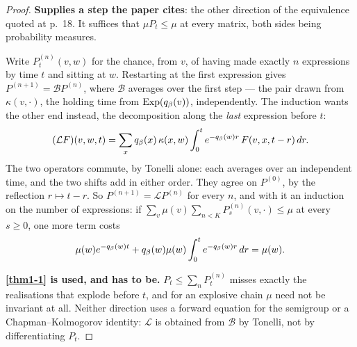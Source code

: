 \begin{proof}
  \leanok
  \textbf{Supplies a step the paper cites}: the other direction of the
  equivalence quoted at p.~18.  It suffices that $\mu P_t \le \mu$ at every
  matrix, both sides being probability measures.

  Write $P^{(n)}_t(v,w)$ for the chance, from $v$, of having made exactly $n$
  expressions by time $t$ and sitting at $w$.  Restarting at the first
  expression gives $P^{(n+1)} = \mathcal{B} P^{(n)}$, where $\mathcal{B}$
  averages over the first step --- the pair drawn from $\kappa(v,\cdot)$, the
  holding time from $\mathrm{Exp}(q_\beta(v))$, independently.  The induction
  wants the other end instead, the decomposition along the \emph{last}
  expression before $t$:
  \[
    (\mathcal{L}F)(v,w,t) = \sum_x q_\beta(x)\,\kappa(x,w)
      \int_0^t e^{-q_\beta(w)r}\,F(v,x,t-r)\,dr .
  \]
  The two operators commute, by Tonelli alone: each averages over an
  independent time, and the two shifts add in either order.  They agree on
  $P^{(0)}$, by the reflection $r \mapsto t - r$.  So $P^{(n+1)} =
  \mathcal{L}P^{(n)}$ for every $n$, and with it an induction on the number of
  expressions: if $\sum_v \mu(v) \sum_{n < K} P^{(n)}_s(v, \cdot) \le \mu$ at
  every $s \ge 0$, one more term costs
  \[
    \mu(w)e^{-q_\beta(w)t} + q_\beta(w)\mu(w)\int_0^t e^{-q_\beta(w)r}\,dr
      = \mu(w) .
  \]

  \textbf{\ref{thm1-1} is used, and has to be.}  $P_t \le \sum_n P^{(n)}_t$
  misses exactly the realisations that explode before $t$, and for an explosive
  chain $\mu$ need not be invariant at all.  Neither direction uses a forward
  equation for the semigroup or a Chapman--Kolmogorov identity: $\mathcal{L}$ is
  obtained from $\mathcal{B}$ by Tonelli, not by differentiating $P_t$.
\end{proof}

